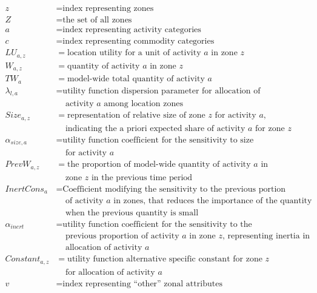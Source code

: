 \begin{align*}
z &= \text{index representing zones} \\
Z &= \text{the set of all zones} \\
a &= \text{index representing activity categories} \\
c &= \text{index representing commodity categories} \\
LU_{a,z} &= \text{location utility for a unit of activity $a$ in zone $z$} \\
W_{a,z} &= \text{quantity of activity $a$ in zone $z$} \\
TW_a &= \text{model-wide total quantity of activity $a$} \\
\lambda_{l,a} &= \text{utility function dispersion parameter for allocation of} \\
 &~~~~~\text{activity $a$ among location zones} \\
Size_{a,z} &= \text{representation of relative size of zone $z$ for activity $a$,} \\
 &~~~~~\text{indicating the a priori expected share of activity $a$ for zone $z$} \\
\alpha_{size,a} &= \text{utility function coefficient for the sensitivity to size} \\
 &~~~~~\text{for activity $a$} \\
PrevW_{a,z} &= \text{the proportion of model-wide quantity of activity $a$ in} \\
 &~~~~~\text{zone $z$ in the previous time period} \\ 
InertCons_a &= \text{Coefficient modifying the sensitivity to the previous portion} \\
 &~~~~~\text{of activity $a$ in zones, that reduces the importance of the quantity} \\
 &~~~~~\text{when the previous quantity is small} \\
\alpha_{inert} &= \text{utility function coefficient for the sensitivity to the} \\
 &~~~~~\text{previous proportion of activity $a$ in zone $z$, representing inertia in} \\
 &~~~~~\text{allocation of activity $a$} \\
Constant_{a,z} &= \text{utility function alternative specific constant for zone $z$} \\
 &~~~~~\text{for allocation of activity $a$} \\
v &= \text{index representing ``other'' zonal attributes} \\

\end{align*}
